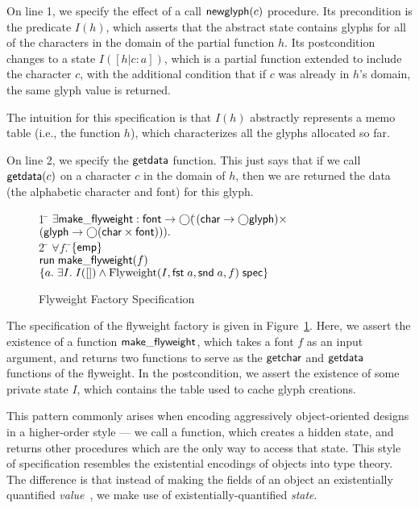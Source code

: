 On line 1, we specify the effect of a call $\mathsf{newglyph}(c)$
procedure. Its precondition is the predicate $I(h)$, which asserts
that the abstract state contains glyphs for all of the characters in
the domain of the partial function $h$. Its postcondition changes to a
state $I([h|c:a])$, which is a partial function extended to include
the character $c$, with the additional condition that if $c$ was
already in $h$'s domain, the same glyph value is returned. 

The intuition for this specification is that $I(h)$ abstractly represents
a memo table (i.e., the function $h$), which characterizes all the 
glyphs allocated so far. 

On line 2, we specify the $\mathsf{getdata}$ function. This just says 
that if we call $\mathsf{getdata}(c)$ on a character $c$ in the domain
of $h$, then we are returned the data (the alphabetic character 
and font) for this glyph. 

\begin{figure}
\begin{tabbing}
1 \qquad \= $\exists \mathsf{make\_flyweight} :
\mathsf{font} \to \bigcirc($\=$(\mathsf{char} \to \bigcirc{\mathsf{glyph}}) \times$ \\
\> \> $(\mathsf{glyph} \to \bigcirc{(\mathsf{char}\times \mathsf{font})})).$\\
2 \> \;\;\= $\forall f.\;$\=$\{{\mathsf{emp}}\}$ \\
  \>\> \> $\mathsf{run}\;{\mathsf{make\_flyweight}(f)}$ \\
  \>\> \> $\{{a.\; \exists I.\; I([]) \land {\mbox{Flyweight}(I, \mathsf{fst}\; a, \mathsf{snd}\; a, f)}\;\mathsf{spec}}\}$ 
\end{tabbing}
\caption{Flyweight Factory Specification}
\label{flyweight-factory-spec}
\end{figure}


The specification of the flyweight factory is given in
Figure~\ref{flyweight-factory-spec}.  Here, we assert the existence of
a function $\mathsf{make\_flyweight}$, which takes a font $f$ as an
input argument, and returns two functions to serve as the
$\mathsf{getchar}$ and $\mathsf{getdata}$ functions of the flyweight. In
the postcondition, we assert the existence of some private state $I$,
which contains the table used to cache glyph creations.

This pattern commonly arises when encoding aggressively
object-oriented designs in a higher-order style --- we call a
function, which creates a hidden state, and returns other procedures
which are the only way to access that state. This style of
specification resembles the existential encodings of objects into type
theory. The difference is that instead of making the fields of an
object an existentially quantified \emph{value}~\cite{pierce-turner}, we
make use of existentially-quantified \emph{state}.

